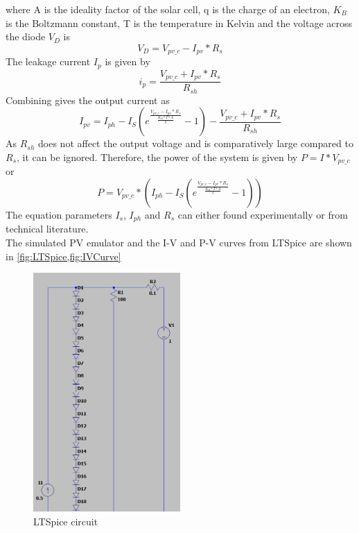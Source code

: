 \documentclass[]{article}
\begin{document}
    	        where A is the ideality factor of the solar cell, q is the charge of an electron, $K_B$ is the Boltzmann constant, T is the temperature in Kelvin and the voltage across the diode $V_D$ is
    	        \begin{equation}\label{eq:DiodeVoltage}
    	            V_D=V_{pv\_c}-I_{pv}*R_s
    	        \end{equation}
    	        The leakage current $I_p$ is given by
    	        \begin{equation}\label{eq:LeakageCurrent}
    	            i_p=\frac{V_{pv\_c}+I_{pv}*R_s}{R_{sh}}
    	        \end{equation}
    	        Combining  gives the output current as
    	        \begin{equation}
    	            I_{pv}=I_{ph}-I_S(e^\frac{V_{pv\_c}-I_{pv}*R_s}{\frac{K_B*T*A}{q}}-1)-\frac{V_{pv\_c}+I_{pv}*R_s}{R_{sh}}
    	        \end{equation}
    	        As $R_{sh}$ does not affect the output voltage and is comparatively large compared to $R_s$, it can be ignored. Therefore, the power of the system is given by $P=I*V_{pv\_c}$ or
    	        \begin{equation}
    	            P=V_{pv\_c}*(I_{ph}-I_S(e^\frac{V_{pv\_c}-I_{pv}*R_s}{\frac{K_B*T*A}{q}}-1))
    	        \end{equation}
    	        The equation parameters $I_s$, $I_{ph}$ and $R_s$ can either found experimentally or from technical literature.
    	        \\
    	        The simulated PV emulator and the I-V and P-V curves from LTSpice are shown in \cref{fig:LTSpice,fig:IVCurve}
    	        \begin{figure}[H]
    	        	\centering
    	        	\includegraphics[width=0.5\textwidth]{Prework_images/LTSpice_cropped}
    	        	\caption{LTSpice circuit}
    	        	\label{fig:LTSpice}
    	        \end{figure}
\end{document}
